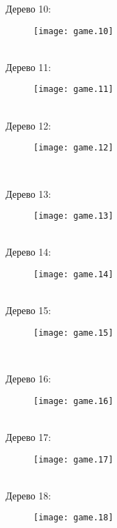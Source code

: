\documentclass[pdftex,12pt,a4paper]{article}
\begin{document}
\newpage

Дерево 10: \\
\begin{figure}[htbp]
    \texttt{[image: game.10]}
\end{figure}\\

Дерево 11: \\
\begin{figure}[htbp]
    \texttt{[image: game.11]}
\end{figure}\\

Дерево 12: \\
\begin{figure}[htbp]
    \texttt{[image: game.12]}
\end{figure}\\

\newpage

Дерево 13: \\
\begin{figure}[htbp]
    \texttt{[image: game.13]}
\end{figure}\\

Дерево 14: \\
\begin{figure}[htbp]
    \texttt{[image: game.14]}
\end{figure}\\

Дерево 15: \\
\begin{figure}[htbp]
    \texttt{[image: game.15]}
\end{figure}\\

\newpage

Дерево 16: \\
\begin{figure}[htbp]
    \texttt{[image: game.16]}
\end{figure}\\

Дерево 17: \\
\begin{figure}[htbp]
    \texttt{[image: game.17]}
\end{figure}\\


Дерево 18: \\
\begin{figure}[htbp]
    \texttt{[image: game.18]}
\end{figure}\\
\end{document}
